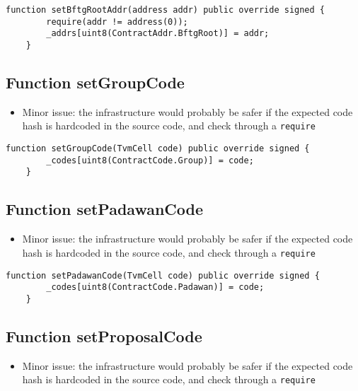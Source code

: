 \begin{lstlisting}[firstnumber=26]
    function setBftgRootAddr(address addr) public override signed {
        require(addr != address(0));
        _addrs[uint8(ContractAddr.BftgRoot)] = addr;
    }
\end{lstlisting}

\subsection{Function setGroupCode}

\begin{itemize}
\item Minor issue: the infrastructure would probably be safer if the
  expected code hash is hardcoded in the source code, and check
  through a {\tt require}
\end{itemize}

\begin{lstlisting}[firstnumber=19]
    function setGroupCode(TvmCell code) public override signed {
        _codes[uint8(ContractCode.Group)] = code;
    }
\end{lstlisting}

\subsection{Function setPadawanCode}

\begin{itemize}
\item Minor issue: the infrastructure would probably be safer if the
  expected code hash is hardcoded in the source code, and check
  through a {\tt require}
\end{itemize}

\begin{lstlisting}[firstnumber=13]
    function setPadawanCode(TvmCell code) public override signed {
        _codes[uint8(ContractCode.Padawan)] = code;
    }
\end{lstlisting}

\subsection{Function setProposalCode}

\begin{itemize}
\item Minor issue: the infrastructure would probably be safer if the
  expected code hash is hardcoded in the source code, and check
  through a {\tt require}
\end{itemize}

